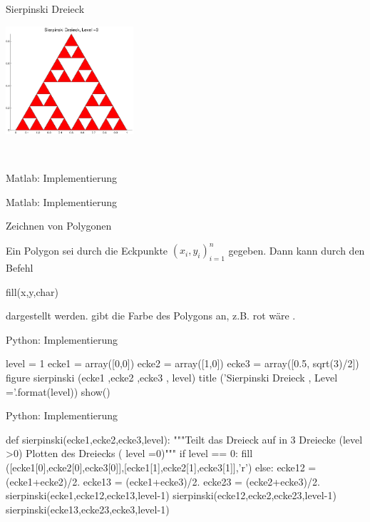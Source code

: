 \documentclass[hyperref={xetex}]{beamer}
\begin{document}
\begin{frame}[fragile]{Sierpinski Dreieck}
\begin{minipage}{5cm}
\end{minipage} \hfill
\begin{minipage}{5cm}
\includegraphics[height=4cm]{figures/sierpinski_3}
\end{minipage} \\
\end{frame}
%
%
\begin{frame}[fragile]{Matlab: Implementierung}
\end{frame}
\begin{frame}[fragile]{Matlab: Implementierung}
\end{frame}
% 
% 
\begin{frame}[fragile]{Zeichnen von Polygonen}

Ein Polygon sei durch die Eckpunkte $(x_i,y_i)_{i=1}^n$ gegeben. Dann
kann durch den Befehl
\begin{matlabin}
fill(x,y,char)
\end{matlabin}
dargestellt werden.  gibt die Farbe des Polygons an, z.B. rot
wäre .
\end{frame}
%
%
\begin{frame}[fragile]{Python: Implementierung}
  \begin{pyin}
level = 1
ecke1 = array([0,0])
ecke2 = array([1,0])
ecke3 = array([0.5, sqrt(3)/2])
figure
sierpinski (ecke1 ,ecke2 ,ecke3 , level)
title ('Sierpinski Dreieck , Level ={}'.format(level))    
show()
  \end{pyin}
\end{frame}
\begin{frame}[fragile]{Python: Implementierung}
  \begin{pyin}
def sierpinski(ecke1,ecke2,ecke3,level):
    """Teilt das Dreieck auf in 3 Dreiecke (level >0) 
    Plotten des Dreiecks ( level =0)"""
    if level == 0:
        fill ([ecke1[0],ecke2[0],ecke3[0]],[ecke1[1],ecke2[1],ecke3[1]],'r')
    else:
        ecke12 = (ecke1+ecke2)/2.
        ecke13 = (ecke1+ecke3)/2.
        ecke23 = (ecke2+ecke3)/2.
        sierpinski(ecke1,ecke12,ecke13,level-1)
        sierpinski(ecke12,ecke2,ecke23,level-1)
        sierpinski(ecke13,ecke23,ecke3,level-1)    
  \end{pyin}
\end{frame}
\end{document}
